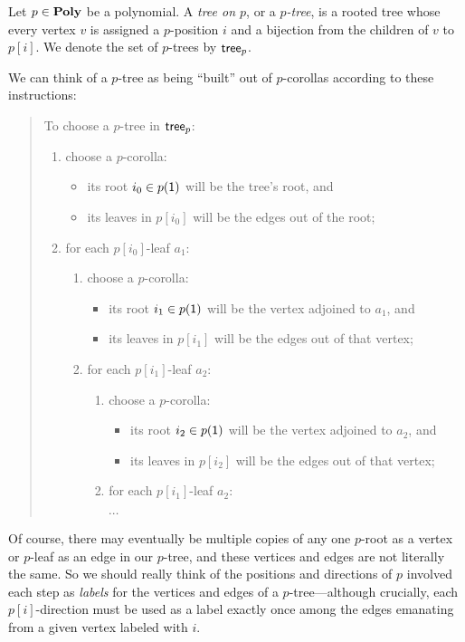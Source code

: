 \documentclass[Book-Poly]{subfiles}
\begin{document}
\begin{definition} \label{def.poly_tree}
Let $p\in\mathbf{Poly}$ be a polynomial.
A \emph{tree on $p$}, or a \emph{$p$-tree}, is a rooted tree whose every vertex $v$ is assigned a $p$-position $i$ and a bijection from the children of $v$ to $p[i]$.
We denote the set of $p$-trees by $\mathsf{tree}_p$.
\end{definition}
We can think of a $p$-tree as being ``built'' out of $p$-corollas according to these instructions:
\begin{quote}
To choose a $p$-tree in $\mathsf{tree}_p$: 
\begin{enumerate}
    \item choose a $p$-corolla:
    \begin{itemize}
        \item its root $i_0\in p(\textsf{1})$ will be the tree's root, and
        \item its leaves in $p[i_0]$ will be the edges out of the root;
    \end{itemize}
    \item for each $p[i_0]$-leaf $a_1$:
    \begin{enumerate}[label*=\arabic*.]
        \item choose a $p$-corolla:
        \begin{itemize}
            \item its root $i_1\in p(\textsf{1})$ will be the vertex adjoined to $a_1$, and
            \item its leaves in $p[i_1]$ will be the edges out of that vertex;
        \end{itemize}
        \item for each $p[i_1]$-leaf $a_2$:
        \begin{enumerate}[label*=\arabic*.]
            \item choose a $p$-corolla:
            \begin{itemize}
                \item its root $i_2\in p(\textsf{1})$ will be the vertex adjoined to $a_2$, and
                \item its leaves in $p[i_2]$ will be the edges out of that vertex;
            \end{itemize}
            \item for each $p[i_1]$-leaf $a_2$:
            
            $\cdots$
        \end{enumerate}
    \end{enumerate}
\end{enumerate}
\end{quote}
Of course, there may eventually be multiple copies of any one $p$-root as a vertex or $p$-leaf as an edge in our $p$-tree, and these vertices and edges are not literally the same.
So we should really think of the positions and directions of $p$ involved each step as \emph{labels} for the vertices and edges of a $p$-tree---although crucially, each $p[i]$-direction must be used as a label exactly once among the edges emanating from a given vertex labeled with $i$.
\end{document}
